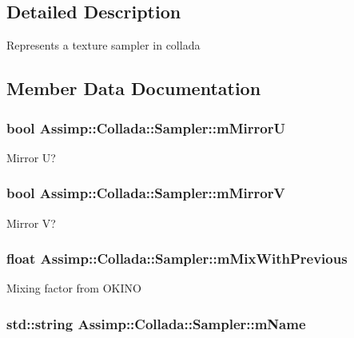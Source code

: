 \subsection{Detailed Description}
Represents a texture sampler in collada 

\subsection{Member Data Documentation}
\hypertarget{struct_assimp_1_1_collada_1_1_sampler_a4c4485a21aeabe8a95087cba22f04f89}{
\subsubsection[{m\+Mirror\+U}]{\setlength{\rightskip}{0pt plus 5cm}bool Assimp\+::\+Collada\+::\+Sampler\+::m\+Mirror\+U}}\label{struct_assimp_1_1_collada_1_1_sampler_a4c4485a21aeabe8a95087cba22f04f89}
Mirror U? \hypertarget{struct_assimp_1_1_collada_1_1_sampler_a140bba5380d353b5ba6223d2cb18fa5d}{
\subsubsection[{m\+Mirror\+V}]{\setlength{\rightskip}{0pt plus 5cm}bool Assimp\+::\+Collada\+::\+Sampler\+::m\+Mirror\+V}}\label{struct_assimp_1_1_collada_1_1_sampler_a140bba5380d353b5ba6223d2cb18fa5d}
Mirror V? \hypertarget{struct_assimp_1_1_collada_1_1_sampler_a73af972a68acf1bedb30b8f27081b9c8}{
\subsubsection[{m\+Mix\+With\+Previous}]{\setlength{\rightskip}{0pt plus 5cm}float Assimp\+::\+Collada\+::\+Sampler\+::m\+Mix\+With\+Previous}}\label{struct_assimp_1_1_collada_1_1_sampler_a73af972a68acf1bedb30b8f27081b9c8}
Mixing factor from O\+K\+I\+N\+O \hypertarget{struct_assimp_1_1_collada_1_1_sampler_aa64f138f728b417ef39c72820ba781d7}{
\subsubsection[{m\+Name}]{\setlength{\rightskip}{0pt plus 5cm}std\+::string Assimp\+::\+Collada\+::\+Sampler\+::m\+Name}}\label{struct_assimp_1_1_collada_1_1_sampler_aa64f138f728b417ef39c72820ba781d7}
